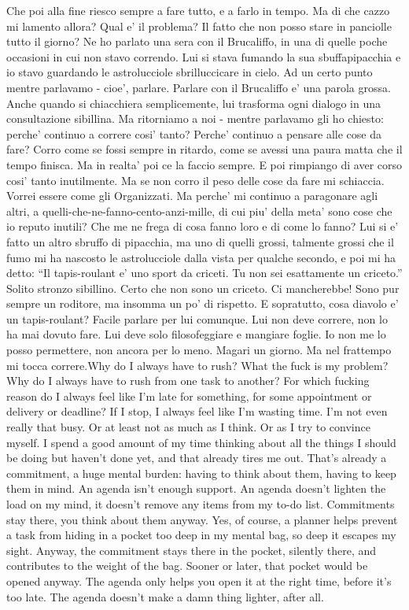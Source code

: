 {Che poi alla fine riesco sempre a fare tutto, e a farlo in tempo. Ma di che cazzo mi lamento allora? Qual e’ il problema? Il fatto che non posso stare in panciolle tutto il giorno? Ne ho parlato una sera con il Brucaliffo, in una di quelle poche occasioni in cui non stavo correndo. Lui si stava fumando la sua sbuffapipacchia e io stavo guardando le astrolucciole sbrilluccicare in cielo. Ad un certo punto mentre parlavamo - cioe', parlare. Parlare con il Brucaliffo e’ una parola grossa. Anche quando si chiacchiera semplicemente, lui trasforma ogni dialogo in una consultazione sibillina. Ma ritorniamo a noi - mentre parlavamo gli ho chiesto: perche’ continuo a correre cosi’ tanto? Perche’ continuo a pensare alle cose da fare? Corro come se fossi sempre in ritardo, come se avessi una paura matta che il tempo finisca. Ma in realta’ poi ce la faccio sempre. E poi rimpiango di aver corso cosi’ tanto inutilmente. Ma se non corro il peso delle cose da fare mi schiaccia. Vorrei essere come gli Organizzati. Ma perche’ mi continuo a paragonare agli altri, a quelli-che-ne-fanno-cento-anzi-mille, di cui piu’ della meta' sono cose che io reputo inutili? Che me ne frega di cosa fanno loro e di come lo fanno? Lui si e’ fatto un altro sbruffo di pipacchia, ma uno di quelli grossi, talmente grossi che il fumo mi ha nascosto le astrolucciole dalla vista per qualche secondo, e poi mi ha detto: “Il tapis-roulant e’ uno sport da criceti. Tu non sei esattamente un criceto.” Solito stronzo sibillino. Certo che non sono un criceto. Ci mancherebbe! Sono pur sempre un roditore, ma insomma un po’ di rispetto. E sopratutto, cosa diavolo e’ un tapis-roulant?
Facile parlare per lui comunque. Lui non deve correre, non lo ha mai dovuto fare. Lui deve solo filosofeggiare e mangiare foglie. Io non me lo posso permettere, non ancora per lo meno. Magari un giorno. Ma nel frattempo mi tocca correre.}{Why do I always have to rush? What the fuck is my problem? Why do I always have to rush from one task to another? For which fucking reason do I always feel like I'm late for something, for some appointment or delivery or deadline? If I stop, I always feel like I'm wasting time. I'm not even really that busy. Or at least not as much as I think. Or as I try to convince myself.
I spend a good amount of my time thinking about all the things I should be doing but haven't done yet, and that already tires me out. That's already a commitment, a huge mental burden: having to think about them, having to keep them in mind.
An agenda isn't enough support. An agenda doesn't lighten the load on my mind, it doesn't remove any items from my to-do list. Commitments stay there, you think about them anyway. Yes, of course, a planner helps prevent a task from hiding in a pocket too deep in my mental bag, so deep it escapes my sight. Anyway, the commitment stays there in the pocket, silently there, and contributes to the weight of the bag. Sooner or later, that pocket would be opened anyway. The agenda only helps you open it at the right time, before it's too late. The agenda doesn't make a damn thing lighter, after all.
}
